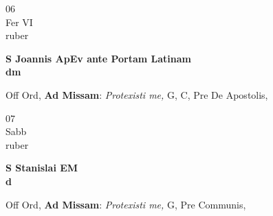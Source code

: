 \documentclass[10pt, openany]{book}
\begin{document}
        \begin{center}
            \begin{minipage}{3.5in}
                \vspace{2em}
                \begin{minipage}{0.5in}
                    {\Huge 06} \\
                    {\normalsize Fer VI} \\
                    {\normalsize ruber}
                \end{minipage}
                \begin{minipage}{3.0in}
                    \textbf{ \large S Joannis ApEv ante Portam Latinam \\
                    \textnormal{\normalsize dm}} \\ 
                \end{minipage}
                \begin{justify}Off Ord, \textbf{Ad Missam}: \textit{Protexisti me,} G, C, Pre De Apostolis,   
                \end{justify}
            \end{minipage}
        \end{center}
    
        \begin{center}
            \begin{minipage}{3.5in}
                \vspace{2em}
                \begin{minipage}{0.5in}
                    {\Huge 07} \\
                    {\normalsize Sabb} \\
                    {\normalsize ruber}
                \end{minipage}
                \begin{minipage}{3.0in}
                    \textbf{ \large S Stanislai EM \\
                    \textnormal{\normalsize d}} \\ 
                \end{minipage}
                \begin{justify}Off Ord, \textbf{Ad Missam}: \textit{Protexisti me,} G, Pre Communis,   
                \end{justify}
            \end{minipage}
        \end{center}
    
\end{document}
